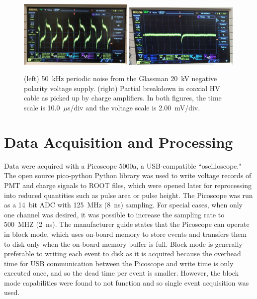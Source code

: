  \begin{figure}[htbp]
\begin{center}
\includegraphics[width = 0.49\textwidth, keepaspectratio]{figures/testbed/glassman_noise.png}
\includegraphics[width = 0.49\textwidth, keepaspectratio]{figures/testbed/partial_breakdown_pickup.png}
\caption{(left) 50~kHz periodic noise from the Glassman 20~kV negative polarity voltage supply. (right) Partial breakdown in coaxial \ac{HV} cable as picked up by charge amplifiers. In both figures, the time scale is 10.0~$\mu$s/div and the voltage scale is 2.00~mV/div.}
\label{fig:pickup_noise}
\end{center}
\end{figure}






\section{Data Acquisition and Processing}
Data were acquired with a Picoscope 5000a, a USB-compatible ``oscilloscope." The open source pico-python Python library was used to write voltage records of \ac{PMT} and charge signals to ROOT files, which were opened later for reprocessing into reduced quantities such as pulse area or pulse height. The Picoscope was run as a 14~bit ADC with 125~MHz (8~ns) sampling. For special cases, when only one channel was desired, it was possible to increase the sampling rate to 500~MHZ (2~ns). The manufacturer guide states that the Picoscope can operate in block mode, which uses on-board memory to store events and transfers them to disk only when the on-board memory buffer is full. Block mode is generally preferable to writing each event to disk as it is acquired because the overhead time for USB communication between the Picoscope and write time is only executed once, and so the dead time per event is smaller. However, the block mode capabilities were found to not function and so single event acquisition was used.

